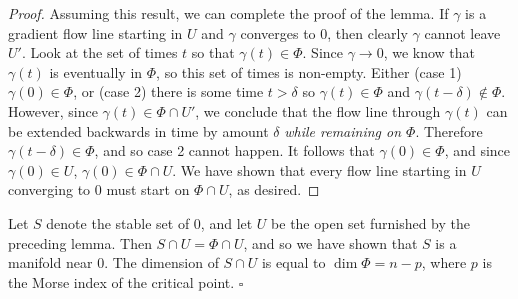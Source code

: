\begin{proof}
  Assuming this result, we can complete the proof of the lemma. If $\gamma$ is a gradient flow line starting in $U$ and $\gamma$ converges to $0$, then clearly $\gamma$ cannot leave $U'$. Look at the set of times $t$ so that $\gamma(t)\in \Phi$. Since $\gamma\to 0$, we know that $\gamma(t)$ is eventually in $\Phi$, so this set of times is non-empty. Either (case 1) $\gamma(0)\in \Phi$, or (case 2) there is some time $t>\delta$ so $\gamma(t)\in \Phi$ and $\gamma(t-\delta)\not\in \Phi$. However, since $\gamma(t)\in \Phi\cap U'$, we conclude that the flow line through $\gamma(t)$ can be extended backwards in time by amount $\delta$ \emph{while remaining on $\Phi$}. Therefore $\gamma(t-\delta)\in \Phi$, and so case 2 cannot happen. It follows that $\gamma(0)\in \Phi$, and since $\gamma(0)\in U$, $\gamma(0)\in \Phi\cap U$. We have shown that every flow line starting in $U$ converging to $0$ must start on $\Phi\cap U$, as desired.
\end{proof}
\begin{cor}
  Let $S$ denote the stable set of $0$, and let $U$ be the open set furnished by the preceding lemma. Then $S\cap U=\Phi\cap U$, and so we have shown that $S$ is a manifold near $0$. The dimension of $S\cap U$ is equal to $\dim \Phi=n-p$, where $p$ is the Morse index of the critical point. \hfill $\square$
\end{cor}

